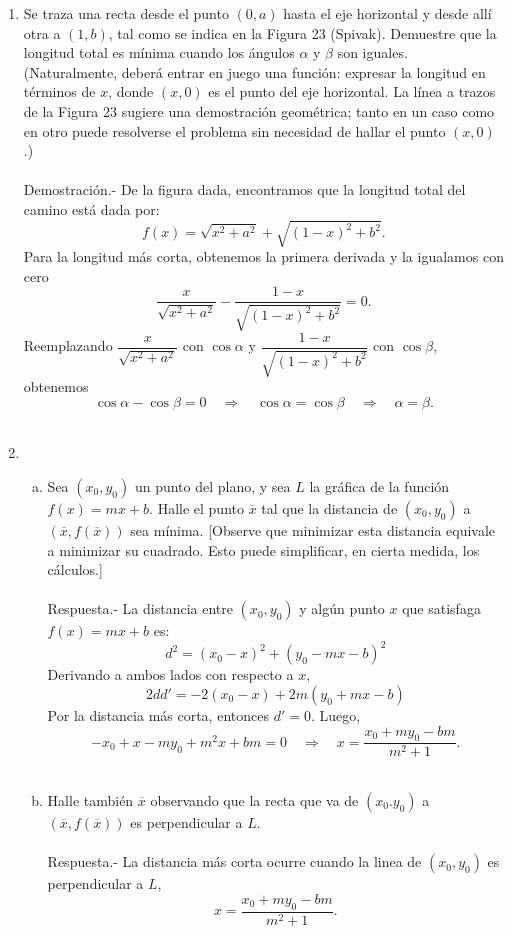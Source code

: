 \begin{enumerate}[\bfseries 1.]
    \item Se traza una recta desde el punto $(0, a)$ hasta el eje horizontal y desde allí otra a $(1, b)$, tal como se indica en la Figura 23 (Spivak). Demuestre que la longitud total es mínima cuando los ángulos $\alpha$ y $\beta$ son iguales. (Naturalmente, deberá entrar en juego una función: expresar la longitud en términos de $x$, donde $(x, 0)$ es el punto del eje horizontal. La línea a trazos de la Figura 23 sugiere una demostración geométrica; tanto en un caso como en otro puede resolverse el problema sin necesidad de hallar el punto $(x, 0)$.)\\\\
	Demostración.-\; De la figura dada, encontramos que la longitud total del camino está dada por: 
	$$f(x)=\sqrt{x^2+a^2}+\sqrt{(1-x)^2+b^2}.$$
	Para la longitud más corta, obtenemos la primera derivada y la igualamos con cero
	$$\dfrac{x}{\sqrt{x^2+a^2}}-\dfrac{1-x}{\sqrt{(1-x)^2+b^2}}=0.$$
	Reemplazando $\dfrac{x}{\sqrt{x^2+a^2}}$ con $\cos \alpha$ y $\dfrac{1-x}{\sqrt{(1-x)^2+b^2}}$ con $\cos \beta$, obtenemos
	$$\cos \alpha-\cos \beta=0 \quad \Rightarrow \quad \cos \alpha = \cos \beta \quad \Rightarrow \quad \alpha = \beta.$$\\

    \item 
	\begin{enumerate}[(a)]

	    \item Sea $(x_0,y_0)$ un punto del plano, y sea $L$ la gráfica de la función $f(x)=mx+b.$ Halle el punto $\overline{x}$ tal que la distancia de $(x_0,y_0)$ a $(\overline{x},f(\overline{x}))$ sea mínima. [Observe que minimizar esta distancia equivale a minimizar su cuadrado. Esto puede simplificar, en cierta medida, los cálculos.]\\\\
		Respuesta.-\; La distancia entre $(x_0,y_0)$ y algún punto $x$ que satisfaga $f(x)=mx+b$ es:
		$$d^2=\left(x_0-x\right)^2+\left(y_0-mx-b\right)^2$$
		Derivando a ambos lados con respecto a $x$, 
		$$2dd'=-2\left(x_0-x\right)+2m\left(y_0+mx-b\right)$$
		Por la distancia más corta, entonces $d'=0$. Luego,
		$$-x_0+x-my_0+m^2x+bm=0 \quad \Rightarrow \quad x=\dfrac{x_0+my_0-bm}{m^2+1}.$$\\

	    \item Halle también $\overline{x}$ observando que la recta que va de $(x_0.y_0)$ a $\left(\overline{x},f(\overline{x})\right)$ es perpendicular a $L$.\\\\
		Respuesta.-\; La distancia más corta ocurre cuando la linea de $(x_0,y_0)$ es perpendicular a $L$,
		$$x=\dfrac{x_0+my_0-bm}{m^2+1}.$$\\


\end{enumerate}
\end{enumerate}
